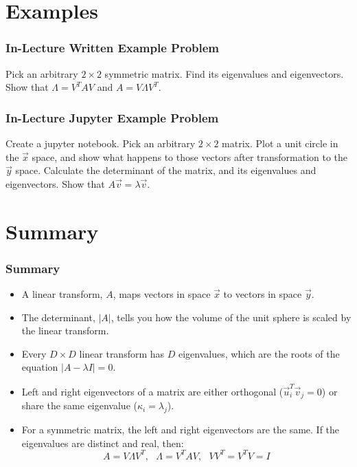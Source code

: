 \documentclass{beamer}
\begin{document}
\section{Examples}
\setcounter{subsection}{1}

\begin{frame}
  \frametitle{In-Lecture Written Example Problem}
  
  Pick an arbitrary $2\times 2$ symmetric matrix.  Find its
  eigenvalues and eigenvectors.  Show that $\Lambda=V^TAV$ and
  $A=V\Lambda V^T$.
\end{frame}
  
\begin{frame}
  \frametitle{In-Lecture Jupyter Example Problem}
  
  Create a jupyter notebook.  Pick an arbitrary $2\times 2$ matrix.
  Plot a unit circle in the $\vec{x}$ space, and show what happens to
  those vectors after transformation to the $\vec{y}$ space.
  Calculate the determinant of the matrix, and its eigenvalues and
  eigenvectors.  Show that $A\vec{v}=\lambda\vec{v}$.
  
\end{frame}
  
\section{Summary}
\setcounter{subsection}{1}

\begin{frame}
  \frametitle{Summary}
  \begin{itemize}
  \item A linear transform, $A$, maps vectors in space $\vec{x}$ to vectors in space $\vec{y}$.
  \item The determinant, $|A|$, tells you how the volume of the unit
    sphere is scaled by the linear transform.
  \item Every $D\times D$ linear transform has $D$ eigenvalues, which
    are the roots of the equation $|A-\lambda I|=0$.
  \item Left and right eigenvectors of a matrix are either orthogonal
    ($\vec{u}_i^T\vec{v}_j=0$) or share the same eigenvalue ($\kappa_i=\lambda_j$).
  \item For a symmetric matrix, the left and right eigenvectors are
    the same.  If the eigenvalues are distinct and real, then:
    \[
    A=V\Lambda V^T,~~~\Lambda = V^TAV,~~~VV^T=V^TV=I
    \]
  \end{itemize}
\end{frame}
\end{document}
